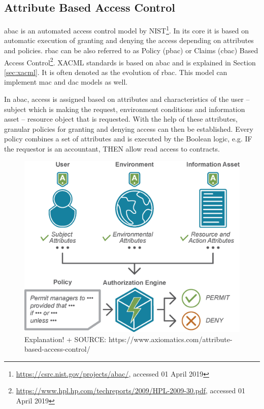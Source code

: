 \subsection{Attribute Based Access Control} \label{ABAC_SOTA}

\acrfull{abac} is an automated access control model by NIST\footnote{\url{https://csrc.nist.gov/projects/abac/}, accessed 01 April 2019}. In its core it is based on automatic execution of granting and denying the access depending on attributes and policies. \acrshort{rbac} can be also referred to as Policy (\acrshort{pbac}) or Claims (\acrshort{cbac}) Based Access Control\footnote{\url{https://www.hpl.hp.com/techreports/2009/HPL-2009-30.pdf}, accessed 01 April 2019}. XACML standards is based on \acrshort{abac} and is explained in Section \ref{sec:xacml}. It is often denoted as the evolution of \acrshort{rbac}. This model can implement \acrshort{mac} and \acrshort{dac} models as well.

In \acrshort{abac}, access is assigned based on attributes and characteristics of the user – subject which is making the request, environment conditions and information asset – resource object that is requested. With the help of these attributes, granular policies for granting and denying access can then be established. Every policy combines a set of attributes and is executed by the Boolean logic, e.g. IF the requestor is an accountant, THEN allow read access to contracts.

\begin{figure}[ht]
    \centering
    \includegraphics[width=.7\textwidth]{00images/ABAC}
    \caption{Explanation! + SOURCE: https://www.axiomatics.com/attribute-based-access-control/}
    \label{fig:ABAC_diagram_sota}
\end{figure}